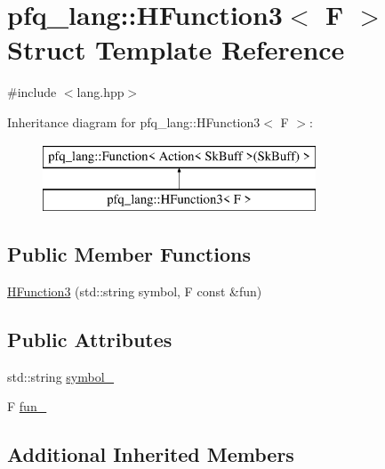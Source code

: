 \hypertarget{structpfq__lang_1_1HFunction3}{\section{pfq\+\_\+lang\+:\+:H\+Function3$<$ F $>$ Struct Template Reference}
\label{structpfq__lang_1_1HFunction3}
}


{\ttfamily \#include $<$lang.\+hpp$>$}

Inheritance diagram for pfq\+\_\+lang\+:\+:H\+Function3$<$ F $>$\+:\begin{figure}[H]
\begin{center}
\leavevmode
\includegraphics[height=2.000000cm]{structpfq__lang_1_1HFunction3}
\end{center}
\end{figure}
\subsection*{Public Member Functions}
\begin{DoxyCompactItemize}
\item 
\hyperlink{structpfq__lang_1_1HFunction3_ae3e015cd8bcc99f4b1c3b38367964371}{H\+Function3} (std\+::string symbol, F const \&fun)
\end{DoxyCompactItemize}
\subsection*{Public Attributes}
\begin{DoxyCompactItemize}
\item 
std\+::string \hyperlink{structpfq__lang_1_1HFunction3_ae0ba31689b517305a696401dbd63bd31}{symbol\+\_\+}
\item 
F \hyperlink{structpfq__lang_1_1HFunction3_ab7ac85c47b00236fa5d8dbd268669770}{fun\+\_\+}
\end{DoxyCompactItemize}
\subsection*{Additional Inherited Members}


